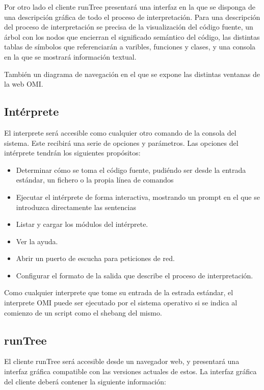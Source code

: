 Por otro lado el cliente runTree presentará una interfaz en la que se disponga de una descripción gráfica de todo el proceso 
de interpretación. Para una descripción del proceso de interpretación se precisa de la visualización del código fuente, un árbol con los nodos
que encierran el significado semántico del código, las distintas tablas de símbolos que referenciarán a varibles, funciones y clases, y una consola
en la que se mostrará información textual.

También un diagrama de navegación en el que se expone las distintas ventanas de la web OMI.
\subsection{Intérprete}
El interprete será accesible como cualquier otro comando de la consola del sistema. Este recibirá una serie de opciones y parámetros. 
Las opciones del intérprete tendrán los siguientes propósitos:
\begin{itemize}
\item Determinar cómo se toma el código fuente, pudiéndo ser desde la entrada estándar, un fichero o la propia línea de comandos
\item Ejecutar el intérprete de forma interactiva, mostrando un prompt en el que se introduzca directamente las sentencias
\item Listar y cargar los módulos del intérprete.
\item Ver la ayuda.
\item Abrir un puerto de escucha para peticiones de red.
\item Configurar el formato de la salida que describe el proceso de interpretación.
\end{itemize}

Como cualquier interprete que tome su entrada de la estrada estándar, el interprete OMI puede ser ejecutado por el 
sistema operativo si se indica al comienzo de un script como el shebang del mismo. 
\subsection{runTree}
El cliente runTree será accesible desde un navegador web, y presentará una interfaz gráfica compatible con las versiones actuales de estos.
La interfaz gráfica del cliente deberá contener la siguiente información:

